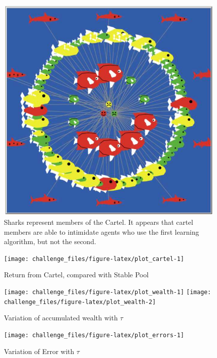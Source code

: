 \documentclass[]{article}
\begin{document}
\begin{figure}[p]

{\centering \includegraphics[width=.49\linewidth]{Cartel} 

}

\caption{Sharks represent members of the Cartel. It appears that cartel members are able to intimidate agents who use the first learning algorithm, but not the second.\label{fig:ui-cartel}}\label{fig:unnamed-chunk-11}
\end{figure}

\begin{figure}[p]

{\centering \texttt{[image: challenge\_files/figure-latex/plot\_cartel-1]} 

}

\caption{\label{fig:cartel_return}Return from Cartel, compared with Stable Pool}\label{fig:plot_cartel}
\end{figure}

\begin{figure}[p]

{\centering \texttt{[image: challenge\_files/figure-latex/plot\_wealth-1]} \texttt{[image: challenge\_files/figure-latex/plot\_wealth-2]} 

}

\caption{\label{fig:tau_wealth}Variation of accumulated wealth with $\tau$}\label{fig:plot_wealth}
\end{figure}

\begin{figure}[p]

{\centering \texttt{[image: challenge\_files/figure-latex/plot\_errors-1]} 

}

\caption{\label{fig:tau_error}Variation of Error with $\tau$}\label{fig:plot_errors}
\end{figure}
\end{document}
